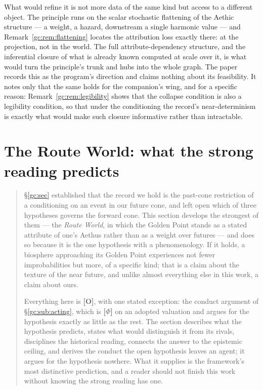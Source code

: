 \documentclass[11pt]{article}
\numberwithin{equation}{section}
\theoremstyle{plain}
\theoremstyle{definition}
\theoremstyle{remark}
\begin{document}
What would refine it is not more data of the same kind but access to a
different object. The principle runs on the scalar stochastic flattening
of the Aethic structure --- a weight, a hazard, downstream a single
harmonic value --- and Remark~\ref{gc:rem:flattening} locates the
attribution loss exactly there: at the projection, not in the world. The
full attribute-dependency structure, and the inferential closure of what
is already known computed at scale over it, is what would turn the
principle's trunk and hubs into the whole graph. The paper records this
as the program's direction and claims nothing about its feasibility. It
notes only that the same holds for the companion's wing, and for a
specific reason: Remark~\ref{gc:rem:legibility} shows that the collapse
condition is also a legibility condition, so that under the conditioning
the record's near-determinism is exactly what would make such closure
informative rather than intractable.

\section{The Route World: what the strong reading predicts}\label{gc:subsub:routeworld}

\begin{quote}\small
\S\ref{gc:sec} established that the record we hold is the past-cone
restriction of a conditioning on an event in our future cone, and left
open which of three hypotheses governs the forward cone. This section
develops the strongest of them --- the \emph{Route World}, in which the
Golden Point stands as a stated attribute of one's Aethus rather than as
a weight over futures --- and does so because it is the one hypothesis
with a phenomenology. If it holds, a biosphere approaching its Golden
Point experiences not fewer improbabilities but more, of a specific kind;
that is a claim about the texture of the near future, and unlike almost
everything else in this work, a claim about ours.

Everything here is \textbf{[O]}, with one stated exception: the
conduct argument of \S\ref{gc:sub:acting}, which is
\textbf{[$\Phi$]} on an adopted valuation and argues for the
hypothesis exactly as little as the rest. The section describes what
the hypothesis predicts, states what would distinguish it from its
rivals, disciplines the historical reading, connects the answer to the
epistemic ceiling, and derives the conduct the open hypothesis leaves
an agent; it argues for the hypothesis nowhere. What it supplies is the framework's most distinctive
prediction, and a reader should not finish this work without knowing the
strong reading has one.
\end{quote}
\end{document}
